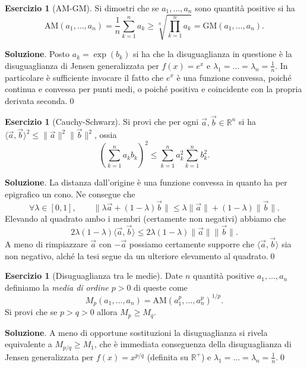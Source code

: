 \documentclass[a4paper,twoside]{article}
\newcommand{\R}{\mathbb{R}}
\theoremstyle{definition}
\newtheorem{ex}[theorem]{Esercizio}
\numberwithin{theorem}{section}
\begin{document}
\begin{shaded}
\begin{ex}[AM-GM] Si dimostri che se $a_1,\ldots,a_n$ sono quantità positive si ha 
$$ \text{AM}\left(a_1,\ldots,a_n\right) = \frac{1}{n}\sum_{k=1}^{n}a_k \geq \sqrt[n]{\prod_{k=1}^{n}a_k} = \text{GM}\left(a_1,\ldots,a_n\right). $$ 
\end{ex}
\end{shaded}
\textbf{Soluzione}. Posto $a_k = \exp\left(b_k\right)$ si ha che la disuguaglianza in questione è la disuguaglianza di Jensen generalizzata per $f(x)=e^x$ e $\lambda_1=\ldots=\lambda_n=\frac{1}{n}$. In particolare è sufficiente invocare il fatto che $e^x$ è una funzione convessa, poiché continua e convessa per punti medi, o poiché positiva e coincidente con la propria derivata seconda.\qed

\begin{shaded}
\begin{ex}[Cauchy-Schwarz] Si provi che per ogni $\vec{a},\vec{b}\in\R^n$ si ha $\langle \vec{a},\vec{b}\rangle^2 \leq \|\vec{a}\|^2\|\vec{b}\|^2$, ossia 
$$ \left(\sum_{k=1}^{n} a_k b_k\right)^2 \leq \sum_{k=1}^{n} a_k^2 \sum_{k=1}^{n} b_k^2. $$
\end{ex}
\end{shaded}
\textbf{Soluzione}. La distanza dall'origine è una funzione convessa in quanto ha per epigrafico un cono. Ne consegue che 
$$\forall \lambda\in[0,1],\qquad \|\lambda\vec{a}+(1-\lambda)\vec{b}\| \leq \lambda\|\vec{a}\|+(1-\lambda)\|\vec{b}\|. $$
Elevando al quadrato ambo i membri (certamente non negativi) abbiamo che 
$$ 2\lambda(1-\lambda)\langle\vec{a},\vec{b}\rangle\leq 2\lambda(1-\lambda)\|\vec{a}\|\|\vec{b}\|. $$
A meno di rimpiazzare $\vec{a}$ con $-\vec{a}$ possiamo certamente supporre che $\langle\vec{a},\vec{b}\rangle$ sia non negativo, alché la tesi segue da un ulteriore elevamento al quadrato.\qed 

\begin{ex}[Disuguaglianza tra le medie] Date $n$ quantità positive $a_1,\ldots,a_n$ definiamo la \emph{media di ordine $p>0$} di queste come 
$$ M_p\left(a_1,\ldots,a_n\right) = \text{AM}\left(a_1^p,\ldots,a_n^p\right)^{1/p}.$$
Si provi che se $p>q>0$ allora $M_p \geq M_q$. 
\end{ex}
\textbf{Soluzione}. A meno di opportune sostituzioni la disuguaglianza si rivela equivalente a $M_{p/q}\geq M_1$, che è immediata conseguenza della disuguaglianza di Jensen generalizzata per $f(x)=x^{p/q}$ (definita su $\R^+$) e $\lambda_1=\ldots=\lambda_n=\frac{1}{n}$.\qed
\end{document}
